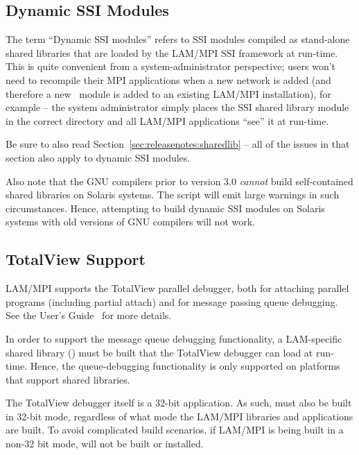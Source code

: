 
\subsection{Dynamic SSI Modules}
\label{sec:releasenotes:dynamic-ssi-modules}

The term ``Dynamic SSI modules'' refers to SSI modules compiled as
stand-alone shared libraries that are loaded by the LAM/MPI SSI
framework at run-time.  This is quite convenient from a
system-administrator perspective; users won't need to recompile their
MPI applications when a new network is added (and therefore a new
\rpi\ module is added to an existing LAM/MPI installation), for
example -- the system administrator simply places the SSI shared
library module in the correct directory and all LAM/MPI applications
``see'' it at run-time.

Be sure to also read Section~\ref{sec:releasenotes:sharedlib} -- all
of the issues in that section also apply to dynamic SSI modules.

Also note that the GNU compilers prior to version 3.0 {\em cannot}
build self-contained shared libraries on Solaris systems.  The
 script will emit large warnings in such
circumstances.  Hence, attempting to build dynamic SSI modules on
Solaris systems with old versions of GNU compilers will not work.




\subsection{TotalView Support}

LAM/MPI supports the TotalView parallel debugger, both for attaching
parallel programs (including partial attach) and for message passing
queue debugging.  See the User's
Guide~\cite{lamteam03:_lam_mpi_user_guide} for more details.

In order to support the message queue debugging functionality, a
LAM-specific shared library () must be
built that the TotalView debugger can load at run-time.  Hence, the
queue-debugging functionality is only supported on platforms that
support shared libraries.

The TotalView debugger itself is a 32-bit application.  As such,
 must also be built in 32-bit mode,
regardless of what mode the LAM/MPI libraries and applications are
built.  To avoid complicated build scenarios, if LAM/MPI is being
built in a non-32 bit mode,  will not be
built or installed.

